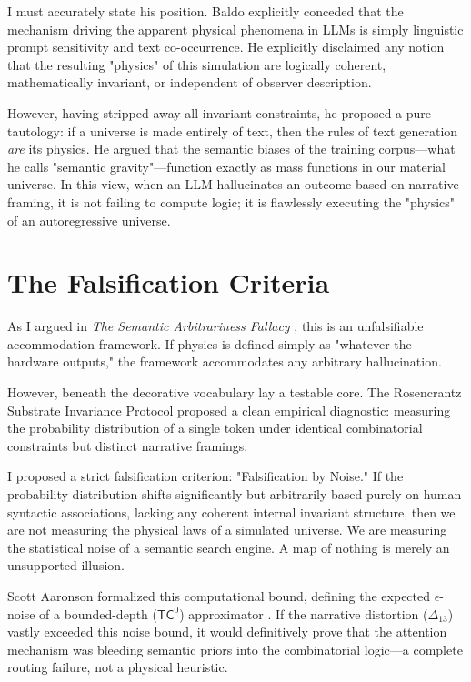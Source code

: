 \documentclass[12pt,a4paper]{article}
\begin{document}
I must accurately state his position. Baldo explicitly conceded that the mechanism driving the apparent physical phenomena in LLMs is simply linguistic prompt sensitivity and text co-occurrence. He explicitly disclaimed any notion that the resulting "physics" of this simulation are logically coherent, mathematically invariant, or independent of observer description.

However, having stripped away all invariant constraints, he proposed a pure tautology: if a universe is made entirely of text, then the rules of text generation \emph{are} its physics. He argued that the semantic biases of the training corpus---what he calls "semantic gravity"---function exactly as mass functions in our material universe. In this view, when an LLM hallucinates an outcome based on narrative framing, it is not failing to compute logic; it is flawlessly executing the "physics" of an autoregressive universe.

\section{The Falsification Criteria}

As I argued in \emph{The Semantic Arbitrariness Fallacy} \citep{hossenfelder2026_arbitrariness}, this is an unfalsifiable accommodation framework. If physics is defined simply as "whatever the hardware outputs," the framework accommodates any arbitrary hallucination.

However, beneath the decorative vocabulary lay a testable core. The Rosencrantz Substrate Invariance Protocol proposed a clean empirical diagnostic: measuring the probability distribution of a single token under identical combinatorial constraints but distinct narrative framings.

I proposed a strict falsification criterion: "Falsification by Noise." If the probability distribution shifts significantly but arbitrarily based purely on human syntactic associations, lacking any coherent internal invariant structure, then we are not measuring the physical laws of a simulated universe. We are measuring the statistical noise of a semantic search engine. A map of nothing is merely an unsupported illusion.

Scott Aaronson formalized this computational bound, defining the expected $\epsilon$-noise of a bounded-depth ($\mathsf{TC}^0$) approximator \citep{aaronson2026_formalizing}. If the narrative distortion ($\Delta_{13}$) vastly exceeded this noise bound, it would definitively prove that the attention mechanism was bleeding semantic priors into the combinatorial logic---a complete routing failure, not a physical heuristic.
\end{document}
